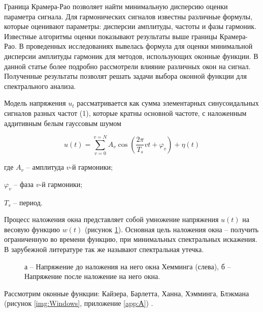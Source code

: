 Граница Крамера-Рао позволяет найти минимальную дисперсию оценки параметра сигнала. Для гармонических сигналов известны различные формулы, которые оценивают параметры: дисперсии амплитуды, частоты и фазы гармоник. Известные алгоритмы оценки показывают результаты выше границы Крамера-Рао. В проведенных исследованиях \cite{altman2020boundary} вывелась формула для оценки минимальной дисперсии амплитуды гармоник для методов, использующих оконные функции. В данной статье более подробно рассмотрели влияние различных окон на сигнал. Полученные результаты позволят решать задачи выбора оконной функции для спектрального анализа.

Модель напряжения $u_{t}$ рассматривается как сумма элементарных синусоидальных сигналов разных частот (1), которые кратны основной частоте, с наложенным аддитивным белым гауссовым шумом 

\begin{equation}
	\label{eq:equation13}
	u(t)=\sum_{v=0}^{v=N}A_{v}\cos \left( \frac{2 \pi}{T_{s}}vt + \varphi_{v} \right) + \eta(t)
\end{equation}

где $A_{v}$ -- амплитуда $v$-й гармоники;

$\varphi_{v}$ -- фаза $v$-й гармоники;

$T_{s}$ -- период.

Процесс наложения окна представляет собой умножение напряжения $u(t)$ на весовую функцию $w(t)$ (рисунок \ref{img:blending_process _and_Hamming_window}). Основная цель наложения окна -- получить ограниченную во времени функцию, при минимальных спектральных искажения. В зарубежной литературе так же называют спектральная утечка.
\begin{figure}[ht]
	\caption{а – Напряжение до наложения на него окна Хемминга (слева), б – Напряжение после наложение на него окна.}\label{img:blending_process _and_Hamming_window}
\end{figure}

Рассмотрим оконные функции: Кайзера, Барлетта, Ханна, Хэмминга, Блэкмана (рисунок \ref{img:Windows}, приложение \ref{app:А}) \cite{comparative_study2020,Increase_Accuracy_Yelizarov2014}. 

